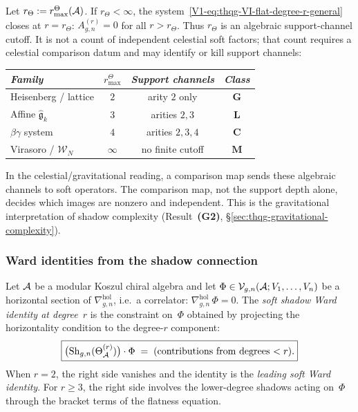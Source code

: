 \begin{remark}
Let \(r_\Theta:=r^\Theta_{\max}(\mathcal{A})\). If \(r_\Theta<\infty\), the
system~\eqref{V1-eq:thqg-VI-flat-degree-r-general} closes at
\(r=r_\Theta\):
\(A^{(r)}_{g,n}=0\) for all \(r>r_\Theta\). Thus
\(r_\Theta\) is an algebraic support-channel cutoff.  It is not a
count of independent celestial soft factors; that count requires a
celestial comparison datum and may identify or kill support channels:
\begin{center}
\small
\renewcommand{\arraystretch}{1.15}
\begin{tabular}{lccc}
\toprule
\emph{Family} &
\(r^\Theta_{\max}\) &
\emph{Support channels} &
\emph{Class} \\
\midrule
Heisenberg / lattice &
 $2$ & arity \(2\) only & $\mathbf{G}$ \\
Affine $\widehat{\mathfrak{g}}_k$ &
 $3$ & arities \(2,3\) & $\mathbf{L}$ \\
$\beta\gamma$ system &
 $4$ & arities \(2,3,4\) & $\mathbf{C}$ \\
Virasoro / $\mathcal{W}_N$ &
 $\infty$ & no finite cutoff & $\mathbf{M}$ \\
\bottomrule
\end{tabular}
\end{center}
In the celestial/gravitational reading, a comparison map sends these
algebraic channels to soft operators.  The comparison map, not the
support depth alone, decides which images are nonzero and independent.
This is the gravitational interpretation of shadow complexity
(Result~\textbf{(G2)}, \S\ref{sec:thqg-gravitational-complexity}).
\end{remark}

\subsubsection{Ward identities from the shadow connection}

\begin{definition}
Let $\mathcal{A}$ be a modular Koszul chiral algebra and let
$\Phi \in \mathcal{V}_{g,n}(\mathcal{A}; V_1, \dotsc, V_n)$ be a horizontal
section of $\nabla^{\mathrm{hol}}_{g,n}$, i.e.\ a correlator:
$\nabla^{\mathrm{hol}}_{g,n}\,\Phi = 0$.
The \emph{soft shadow Ward identity at degree~$r$} is the
constraint on~$\Phi$ obtained by projecting the horizontality
condition to the degree-$r$ component:
\begin{equation}%
\boxed{%
\bigl(\Sh_{g,n}(\Theta^{(r)}_\cA)\bigr) \cdot \Phi
\;=\;
\text{(contributions from degrees $< r$)}.}
\end{equation}
When $r = 2$, the right side vanishes and the identity is the
\emph{leading soft Ward identity}. For $r \geq 3$, the right side
involves the lower-degree shadows acting on~$\Phi$ through the
bracket terms of the flatness equation.
\end{definition}

